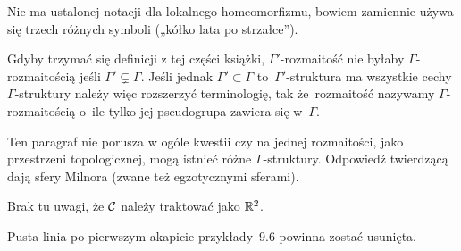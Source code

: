 \documentclass[a4paper,11pt]{article}
\begin{document}
\vspace{\spaceFour}





\noindent
{} Nie ma ustalonej notacji dla lokalnego homeomorfizmu, bowiem
zamiennie używa się trzech różnych symboli („kółko lata po strzałce”).

\vspace{\spaceFour}





\noindent
{} Gdyby trzymać się definicji z tej części książki, $\Gamma'$-rozmaitość
nie byłaby $\Gamma$-rozmaitością jeśli $\Gamma' \subsetneq \Gamma$. Jeśli jednak $\Gamma' \subset \Gamma$
to~$\Gamma'$-struktura ma wszystkie cechy $\Gamma$-struktury należy więc rozszerzyć
terminologię, tak że~rozmaitość nazywamy $\Gamma$-rozmaitością o~ile tylko jej
pseudogrupa zawiera się w~$\Gamma$.

\vspace{\spaceFour}





\noindent
{} Ten paragraf nie porusza w ogóle kwestii czy na jednej
rozmaitości, jako przestrzeni topologicznej, mogą istnieć różne
$\Gamma$-struktury. Odpowiedź twierdzącą dają sfery Milnora (zwane też
egzotycznymi sferami).

\vspace{\spaceFour}





\noindent
{} Brak tu uwagi, że $\mathcal{C}$ należy traktować jako $\mathbb{R}^{ 2 }$.

\vspace{\spaceFour}





\noindent
{} Pusta linia po pierwszym akapicie przykłady~9.6 powinna zostać
usunięta.

\vspace{\spaceFour}
\end{document}
